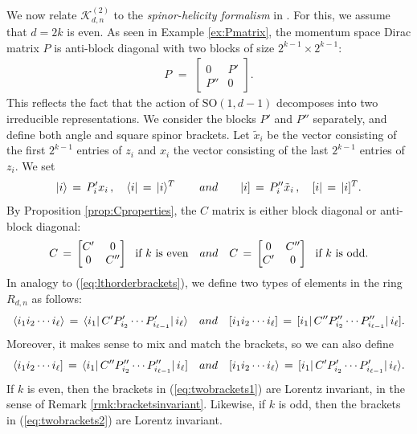 \documentclass[english]{ourlematema}
\numberwithin{theorem}{section}
\theoremstyle{definition}
\begin{document}
We now relate $\mathcal{K}^{(2)}_{d,n}$
 to  the {\em spinor-helicity formalism} in \cite[Section~2.2]{EH}.
For this, we assume that $d=2k$ is even. As seen
in Example \ref{ex:Pmatrix}, the momentum space Dirac matrix $P$ is anti-block diagonal
with two blocks of size $2^{k-1}\times 2^{k-1}$:
\begin{align}
    P \,\,=\,\, \begin{bmatrix}
        0 & P' \\
        P'' & 0
    \end{bmatrix}.
\end{align}
This reflects the fact that the action of $\mathrm{SO}(1,d-1)$ decomposes into two irreducible representations.
  We consider 
the blocks $P'$ and $P''$ separately, and define both angle and square spinor brackets. Let $\tilde{x}_i$ be the vector consisting of the first $2^{k-1}$ entries of $z_i$ and ${x_i}$ the vector consisting of the last $2^{k-1}$ entries of $z_i$. We set
$$
 |{i}\rangle\,=\,P'_i{x}_i \,, \quad
  \langle{i}|\,=\,|{i}\rangle^T\, \qquad {\rm and} \qquad
  |i]\,=\,P''_i \tilde{x}_i \,,\quad [i| \,=\,|i]^T.
  $$
  By Proposition \ref{prop:Cproperties},
the $C$ matrix is either block diagonal or anti-block diagonal:
$$
    C \,=\, \begin{bmatrix}
        C' & 0 \\
        0 & C''
    \end{bmatrix} \,\,\,\,\hbox{if $k$ is even} \quad {\rm and} \quad
    C\, =\, \begin{bmatrix}
        0 & C'' \\
        C' & 0
    \end{bmatrix} \,\,\,\,\hbox{if $k$ is odd.}
    $$
In analogy to (\ref{eq:lthorderbrackets}),
we define two types of elements in the ring $R_{d,n}$ as follows:
\begin{equation}
\label{eq:twobrackets1}
    \langle i_1i_2\cdots i_\ell\rangle\,=\, \langle i_1|\,C'P'_{i_2}\cdots P'_{i_{\ell-1}}|\,i_\ell\rangle
    \quad {\rm and} \quad [i_1i_2\cdots i_\ell]\,=\, [i_1|\,C''P''_{i_2}\cdots P''_{i_{\ell-1}}| \, i_\ell].
\end{equation}
Moreover, it  makes sense to mix and match the brackets, so we can also define
\begin{equation}
\label{eq:twobrackets2}
    \langle i_1i_2\cdots i_\ell]\,=\, \langle i_1|\,C''P''_{i_2}\cdots P''_{i_{\ell-1}}|\,i_\ell]
    \quad {\rm and} \quad [i_1i_2\cdots i_\ell\rangle \,=\, [i_1|\,C'P'_{i_2}\cdots P'_{i_{\ell-1}}|\,i_\ell\rangle.
\end{equation}
If $k$ is even, then the brackets in (\ref{eq:twobrackets1}) are Lorentz invariant,
in the sense of Remark \ref{rmk:bracketsinvariant}. Likewise,
if $k$ is odd, then the brackets in (\ref{eq:twobrackets2}) are Lorentz invariant.
 
\end{document}
